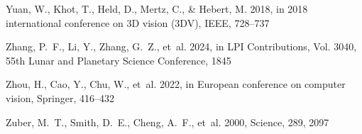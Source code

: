 \begin{thebibliography}{74}
Yuan, W., Khot, T., Held, D., Mertz, C., \& Hebert, M. 2018, in 2018 international conference on 3D vision (3DV), IEEE, 728--737

{Zhang}, P.~F., {Li}, Y., {Zhang}, G.~Z., {et~al.} 2024, in LPI Contributions, Vol. 3040, 55th Lunar and Planetary Science Conference, 1845

Zhou, H., Cao, Y., Chu, W., {et~al.} 2022, in European conference on computer vision, Springer, 416--432

Zuber, M.~T., Smith, D.~E., Cheng, A.~F., {et~al.} 2000, Science, 289, 2097

\end{thebibliography}
